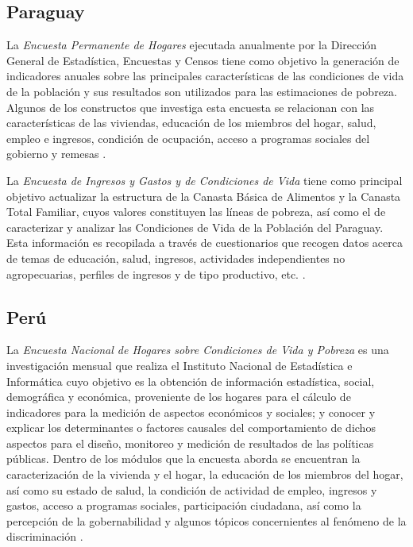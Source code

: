 \documentclass[12pt,spanish,]{book}
\begin{document}
\hypertarget{paraguay}{%
\subsection*{Paraguay}\label{paraguay}}

La \emph{Encuesta Permanente de Hogares} ejecutada anualmente por la Dirección General de Estadística, Encuestas y Censos tiene como objetivo la generación de indicadores anuales sobre las principales características de las condiciones de vida de la población y sus resultados son utilizados para las estimaciones de pobreza. Algunos de los constructos que investiga esta encuesta se relacionan con las características de las viviendas, educación de los miembros del hogar, salud, empleo e ingresos, condición de ocupación, acceso a programas sociales del gobierno y remesas \autocite{DGEEC-PY}.

La \emph{Encuesta de Ingresos y Gastos y de Condiciones de Vida} tiene como principal objetivo actualizar la estructura de la Canasta Básica de Alimentos y la Canasta Total Familiar, cuyos valores constituyen las líneas de pobreza, así como el de caracterizar y analizar las Condiciones de Vida de la Población del Paraguay. Esta información es recopilada a través de cuestionarios que recogen datos acerca de temas de educación, salud, ingresos, actividades independientes no agropecuarias, perfiles de ingresos y de tipo productivo, etc. \autocite{DGEEC2-PY}.

\hypertarget{peru}{%
\subsection*{Perú}\label{peru}}

La \emph{Encuesta Nacional de Hogares sobre Condiciones de Vida y Pobreza} es una investigación mensual que realiza el Instituto Nacional de Estadística e Informática cuyo objetivo es la obtención de información estadística, social, demográfica y económica, proveniente de los hogares para el cálculo de indicadores para la medición de aspectos económicos y sociales; y conocer y explicar los determinantes o factores causales del comportamiento de dichos aspectos para el diseño, monitoreo y medición de resultados de las políticas públicas. Dentro de los módulos que la encuesta aborda se encuentran la caracterización de la vivienda y el hogar, la educación de los miembros del hogar, así como su estado de salud, la condición de actividad de empleo, ingresos y gastos, acceso a programas sociales, participación ciudadana, así como la percepción de la gobernabilidad y algunos tópicos concernientes al fenómeno de la discriminación \autocite{INEI-PE_2016}.
\end{document}
